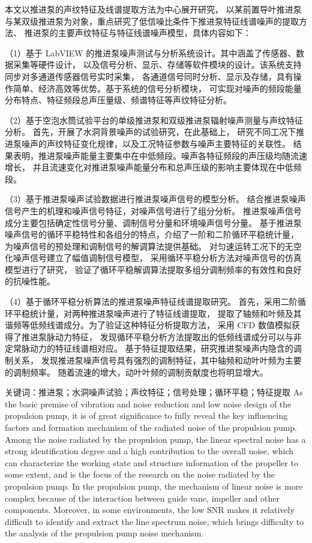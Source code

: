 本文以推进泵的声纹特征及线谱提取方法为中心展开研究，
以某前置导叶推进泵与某双级推进泵为对象，重点研究了低信噪比条件下推进泵特征线谱噪声的提取方法、
推进泵的主要声纹特征与特征线谱噪声模型，具体内容如下：

（1）基于 LabVIEW 的推进泵噪声测试与分析系统设计。其中涵盖了传感器、数据采集等硬件设计，
以及信号分析、显示、存储等软件模块的设计。该系统支持同步对多通道传感器信号实时采集，
各通道信号同时分析、显示及存储，具有操作简单、经济高效等优势。基于系统的信号分析模块，
可实现对噪声的频段能量分布特点、特征频段总声压量级、频谱特征等声纹特征分析。

（2）基于空泡水筒试验平台的单级推进泵和双级推进泵辐射噪声测量与声纹特征分析。
首先，开展了水洞背景噪声的试验研究，在此基础上，
研究不同工况下推进泵噪声的声纹特征变化规律，以及工况特征参数与噪声主要特征的关联性。
结果表明，推进泵噪声能量主要集中在中低频段。噪声各特征频段的声压级均随流速增长，
并且流速变化对推进泵噪声能量分布和总声压级的影响主要体现在中低频段。

（3）基于推进泵噪声试验数据进行推进泵噪声信号的模型分析。
结合推进泵噪声信号产生的机理和噪声信号特征，对噪声信号进行了组分分析。
推进泵噪声信号成分主要包括确定性信号分量、调制信号分量和环境噪声信号分量。
基于推进泵噪声信号的循环平稳特性和各组分的特点，介绍了一阶和二阶循环平稳统计量，
为噪声信号的预处理和调制信号的解调算法提供基础。
对匀速运转工况下的无空化噪声信号建立了幅值调制信号模型，
采用循环平稳分析方法对噪声信号的仿真模型进行了研究，
验证了循环平稳解调算法提取多组分调制频率的有效性和良好的抗噪性能。 

（4）基于循环平稳分析算法的推进泵噪声特征线谱提取研究。
首先，采用二阶循环平稳统计量，对两种推进泵噪声进行了特征线谱提取，
提取了轴频和叶频及其谐频等低频线谱成分。为了验证这种特征分析提取方法，
采用 CFD 数值模拟获得了推进泵脉动力特征，
发现循环平稳分析方法提取出的低频线谱成分可以与非定常脉动力的特征线谱相对应。
基于特征提取结果，研究推进泵噪声内隐含的调制关系，
发现推进泵噪声信号具有强烈的调制特征，其中轴频和动叶叶频为主要的调制频率。
随着流速的增大，动叶叶频的调制贡献度也将明显增大。


\quad

关键词：推进泵；水洞噪声试验；声纹特征；信号处理；循环平稳；特征提取
\cleardoublepage
{}
As the basic premise of vibration and noise reduction and low noise design of the propulsion pump, it is of great significance to fully reveal the key influencing factors and formation mechanism of the radiated noise of the propulsion pump. Among the noise radiated by the propulsion pump, the linear spectral noise has a strong identification degree and a high contribution to the overall noise, which can characterize the working state and structure information of the propeller to some extent, and is the focus of the research on the noise radiated by the propulsion pump. In the propulsion pump, the mechanism of linear noise is more complex because of the interaction between guide vane, impeller and other components. Moreover, in some environments, the low SNR makes it relatively difficult to identify and extract the line spectrum noise, which brings difficulty to the analysis of the propulsion pump noise mechanism.

